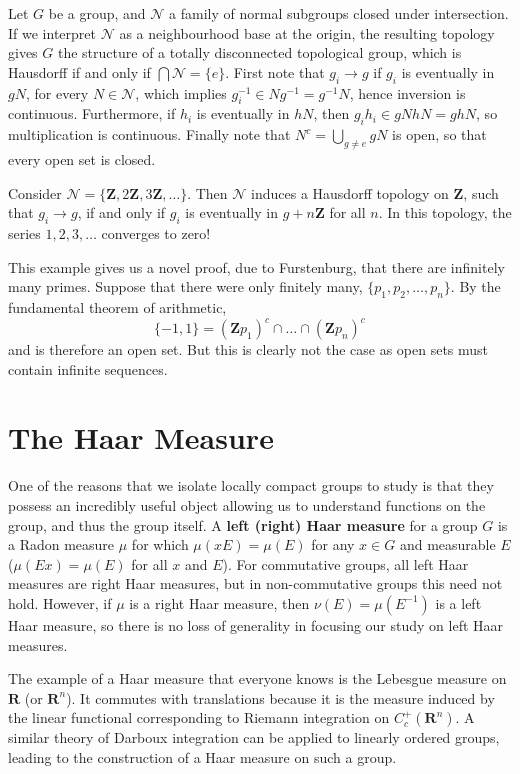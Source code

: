 Let $G$ be a group, and $\mathcal{N}$ a family of normal subgroups closed under intersection. If we interpret $\mathcal{N}$ as a neighbourhood base at the origin, the resulting topology gives $G$ the structure of a totally disconnected topological group, which is Hausdorff if and only if $\bigcap \mathcal{N} = \{ e \}$. First note that $g_i \to g$ if $g_i$ is eventually in $gN$, for every $N \in \mathcal{N}$, which implies $g_i^{-1} \in Ng^{-1} = g^{-1}N$, hence inversion is continuous. Furthermore, if $h_i$ is eventually in $hN$, then $g_ih_i \in gNhN = ghN$, so multiplication is continuous. Finally note that $N^c = \bigcup_{g \neq e} gN$ is open, so that every open set is closed.

\begin{example}
    Consider $\mathcal{N} = \{ \mathbf{Z}, 2\mathbf{Z}, 3\mathbf{Z}, \dots \}$. Then $\mathcal{N}$ induces a Hausdorff topology on $\mathbf{Z}$, such that $g_i \to g$, if and only if $g_i$ is eventually in $g + n \mathbf{Z}$ for all $n$. In this topology, the series $1,2,3,\dots$ converges to zero!
\end{example}

This example gives us a novel proof, due to Furstenburg, that there are infinitely many primes. Suppose that there were only finitely many, $\{ p_1, p_2, \dots, p_n \}$. By the fundamental theorem of arithmetic,
%
\[ \{ -1, 1 \} = (\mathbf{Z} p_1)^c \cap \dots \cap (\mathbf{Z} p_n)^c \]
%
and is therefore an open set. But this is clearly not the case as open sets must contain infinite sequences.

\chapter{The Haar Measure}

One of the reasons that we isolate locally compact groups to study is that they possess an incredibly useful object allowing us to understand functions on the group, and thus the group itself. A {\bf left (right) Haar measure} for a group $G$ is a Radon measure $\mu$ for which $\mu(xE) = \mu(E)$ for any $x \in G$ and measurable $E$ ($\mu(Ex) = \mu(E)$ for all $x$ and $E$). For commutative groups, all left Haar measures are right Haar measures, but in non-commutative groups this need not hold. However, if $\mu$ is a right Haar measure, then $\nu(E) = \mu(E^{-1})$ is a left Haar measure, so there is no loss of generality in focusing our study on left Haar measures.

\begin{example}
    The example of a Haar measure that everyone knows is the Lebesgue measure on $\mathbf{R}$ (or $\mathbf{R}^n$). It commutes with translations because it is the measure induced by the linear functional corresponding to Riemann integration on $C_c^+(\mathbf{R}^n)$. A similar theory of Darboux integration can be applied to linearly ordered groups, leading to the construction of a Haar measure on such a group.
\end{example}

